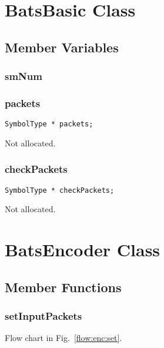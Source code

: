 \documentclass{report}
\begin{document}
\section{BatsBasic Class}

\subsection{Member Variables}


\subsubsection{smNum}

\subsubsection{packets} \label{sec:bas:pkg}

\begin{lstlisting}
SymbolType * packets;  
\end{lstlisting}

Not allocated.

\subsubsection{checkPackets}\label{sec:bas:chpkg}

\begin{lstlisting}
SymbolType * checkPackets;  
\end{lstlisting}

Not allocated. 



\section{BatsEncoder Class}
\label{chap:enc}




\subsection{Member Functions}

\subsubsection{setInputPackets}

Flow chart in Fig.~\ref{flow:enc:set}.
\end{document}
